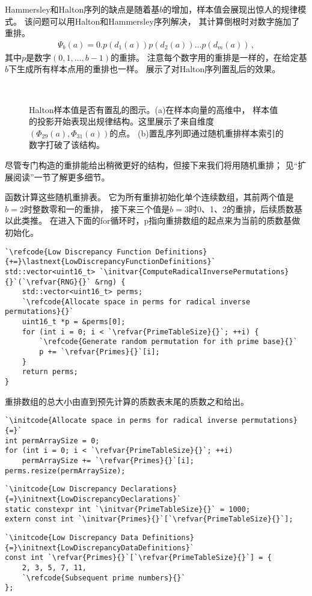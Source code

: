 Hammersley和Halton序列的缺点是随着基$b$的增加，样本值会展现出惊人的规律模式。
该问题可以用Halton和Hammersley序列解决，
其计算倒根时对数字施加了重排。
\begin{align}
    \label{eq:7.8}
    \varPsi_b(a)=0.p(d_1(a))p(d_2(a))\ldots p(d_m(a))\, ,
\end{align}
其中$p$是数字$(0,1,\ldots,b-1)$的重排。
注意每个数字用的重排是一样的，在给定基$b$下生成所有样本点用的重排也一样。
展示了对Halton序列置乱后的效果。
\begin{figure}[htbp]
    \centering
    \,
    \caption{Halton样本值是否有置乱的图示。(a)在样本向量的高维中，
        样本值的投影开始表现出规律结构。这里展示了来自维度$(\varPhi_{29}(a),\varPhi_{31}(a))$的点。
        (b)置乱序列即通过随机重排样本索引的数字打破了该结构。}
    \label{fig:7.26}
\end{figure}

尽管专门构造的重排能给出稍微更好的结构，但接下来我们将用随机重排；
见“扩展阅读”一节了解更多细节。

函数计算这些随机重排表。
它为所有重排初始化单个连续数组，其前两个值是$b=2$时整数零和一的重排，
接下来三个值是$b=3$时0、1、2的重排，后续质数基以此类推。
在进入下面的{\ttfamily for}循环时，{\ttfamily p}指向重排数组的起点来为当前的质数基做初始化。
\begin{lstlisting}
`\refcode{Low Discrepancy Function Definitions}{+=}\lastnext{LowDiscrepancyFunctionDefinitions}`
std::vector<uint16_t> `\initvar{ComputeRadicalInversePermutations}{}`(`\refvar{RNG}{}` &rng) {
    std::vector<uint16_t> perms;
    `\refcode{Allocate space in perms for radical inverse permutations}{}`
    uint16_t *p = &perms[0];
    for (int i = 0; i < `\refvar{PrimeTableSize}{}`; ++i) {
        `\refcode{Generate random permutation for ith prime base}{}`
        p += `\refvar{Primes}{}`[i];
    }
    return perms;
}
\end{lstlisting}

重排数组的总大小由直到预先计算的质数表末尾的质数之和给出。
\begin{lstlisting}
`\initcode{Allocate space in perms for radical inverse permutations}{=}`
int permArraySize = 0;
for (int i = 0; i < `\refvar{PrimeTableSize}{}`; ++i)
    permArraySize += `\refvar{Primes}{}`[i];
perms.resize(permArraySize);
\end{lstlisting}
\begin{lstlisting}
`\initcode{Low Discrepancy Declarations}{=}\initnext{LowDiscrepancyDeclarations}`
static constexpr int `\initvar{PrimeTableSize}{}` = 1000;
extern const int `\initvar{Primes}{}`[`\refvar{PrimeTableSize}{}`];
\end{lstlisting}
\begin{lstlisting}
`\initcode{Low Discrepancy Data Definitions}{=}\initnext{LowDiscrepancyDataDefinitions}`
const int `\refvar{Primes}{}`[`\refvar{PrimeTableSize}{}`] = {
    2, 3, 5, 7, 11,
    `\refcode{Subsequent prime numbers}{}`
};
\end{lstlisting}


